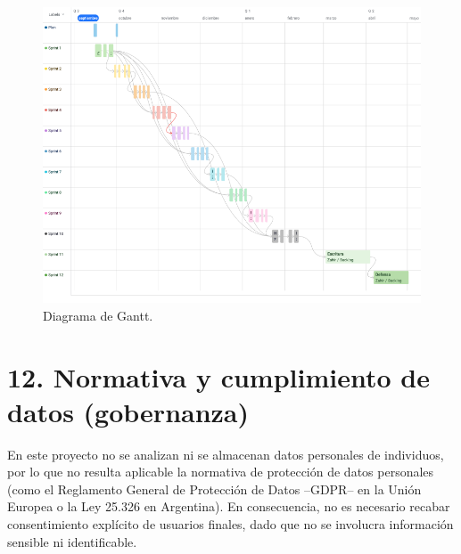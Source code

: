 \documentclass[
11pt, %
]{charter}
\begin{document}
\begin{figure}[htpb]
\centering
\includegraphics[width=1\textwidth]{./Figuras/Gantt.png}
\caption{Diagrama de Gantt.}
\label{fig:diagBloques}
\end{figure}


\vspace{25px}

\newpage
\section{12. Normativa y cumplimiento de datos (gobernanza)}

En este proyecto no se analizan ni se almacenan datos personales de individuos, por lo que no resulta aplicable la normativa de protección de datos personales (como el Reglamento General de Protección de Datos --GDPR-- en la Unión Europea o la Ley 25.326 en Argentina). En consecuencia, no es necesario recabar consentimiento explícito de usuarios finales, dado que no se involucra información sensible ni identificable.
\end{document}
